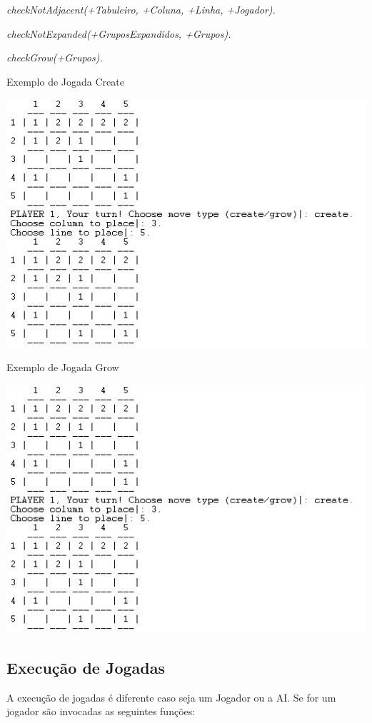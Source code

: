 \documentclass[a4paper]{article}
\begin{document}
\textit{checkNotAdjacent(+Tabuleiro, +Coluna, +Linha, +Jogador).}

\textit{checkNotExpanded(+GruposExpandidos, +Grupos).}

\textit{checkGrow(+Grupos).}


Exemplo de Jogada Create

\includegraphics{prologCreate.JPG}

Exemplo de Jogada Grow

\includegraphics{prologCreate.JPG}


\subsection{Execução de Jogadas} A execução de jogadas é diferente caso seja um Jogador ou a AI.
Se for um jogador são invocadas as seguintes funções:
\end{document}
